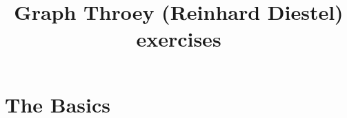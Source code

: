 \documentclass{jarticle}
\title{Graph Throey (Reinhard Diestel) exercises}
\begin{document}
\maketitle

\section{The Basics}

\end{document}
